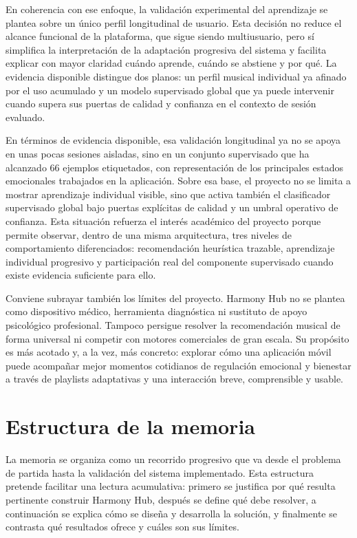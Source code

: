 En coherencia con ese enfoque, la validación experimental del aprendizaje se plantea sobre un único perfil longitudinal de usuario. Esta decisión no reduce el alcance funcional de la plataforma, que sigue siendo multiusuario, pero sí simplifica la interpretación de la adaptación progresiva del sistema y facilita explicar con mayor claridad cuándo aprende, cuándo se abstiene y por qué. La evidencia disponible distingue dos planos: un perfil musical individual ya afinado por el uso acumulado y un modelo supervisado global que ya puede intervenir cuando supera sus puertas de calidad y confianza en el contexto de sesión evaluado.

En términos de evidencia disponible, esa validación longitudinal ya no se apoya
en unas pocas sesiones aisladas, sino en un conjunto supervisado que ha
alcanzado 66 ejemplos etiquetados, con representación de los principales
estados emocionales trabajados en la aplicación. Sobre esa base, el
proyecto no se limita a mostrar aprendizaje individual visible, sino que activa
también el clasificador supervisado global bajo puertas explícitas de calidad y
un umbral operativo de confianza. Esta situación refuerza el interés académico
del proyecto porque permite observar, dentro de una misma arquitectura, tres
niveles de comportamiento diferenciados: recomendación heurística trazable,
aprendizaje individual progresivo y participación real del componente
supervisado cuando existe evidencia suficiente para ello.

Conviene subrayar también los límites del proyecto. Harmony Hub no se plantea como dispositivo médico, herramienta diagnóstica ni sustituto de apoyo psicológico profesional. Tampoco persigue resolver la recomendación musical de forma universal ni competir con motores comerciales de gran escala. Su propósito es más acotado y, a la vez, más concreto: explorar cómo una aplicación móvil puede acompañar mejor momentos cotidianos de regulación emocional y bienestar a través de playlists adaptativas y una interacción breve, comprensible y usable.

\section{Estructura de la memoria}
\label{sec:estructura_memoria}

La memoria se organiza como un recorrido progresivo que va desde el problema de partida hasta la validación del sistema implementado. Esta estructura pretende facilitar una lectura acumulativa: primero se justifica por qué resulta pertinente construir Harmony Hub, después se define qué debe resolver, a continuación se explica cómo se diseña y desarrolla la solución, y finalmente se contrasta qué resultados ofrece y cuáles son sus límites.


